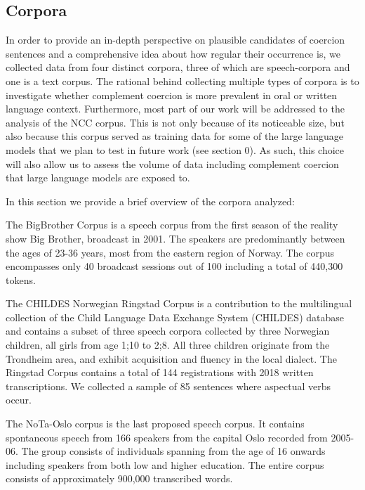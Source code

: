 \documentclass{article}
\begin{document}
\subsection{Corpora}
In order to provide an in-depth perspective on plausible candidates of coercion sentences and a comprehensive idea about how regular their occurrence is, we collected data from four distinct corpora, three of which are speech-corpora and one is a text corpus. The rational behind collecting multiple types of corpora is to investigate whether complement coercion is more prevalent in oral or written language context. Furthermore, most part of our work will be addressed to the analysis of the NCC corpus. This is not only because of its noticeable size, but also because this corpus served as training data for some of the large language models that we plan to test in future work (see section 0). As such, this choice will also allow us to assess the volume of data including complement coercion that large language models are exposed to. 

In this section we provide a brief overview of the corpora analyzed:

The BigBrother Corpus is a speech corpus from the first season of the reality show Big Brother, broadcast in 2001. The speakers are predominantly between the ages of 23-36 years, most from the eastern region of Norway. The corpus encompasses only 40 broadcast sessions out of 100 including a total of 440,300 tokens.

The CHILDES Norwegian Ringstad Corpus \parencite{larsen_byggeklossar_2014} is a contribution to the multilingual collection of the Child Language Data Exchange System (CHILDES) database \parencite{macwhinney_childes_2000} and contains a subset of three speech corpora collected by three Norwegian children, all girls from age 1;10 to 2;8. All three children originate from the Trondheim area, and exhibit acquisition and fluency in the local dialect. The Ringstad Corpus contains a total of 144 registrations with 2018 written transcriptions. We collected a sample of 85 sentences where aspectual verbs occur.

The NoTa-Oslo corpus \parencite{hagen_two_2014} is the last proposed speech corpus. It contains spontaneous speech from 166 speakers from the capital Oslo recorded from 2005-06. The group consists of individuals spanning from the age of 16 onwards including speakers from both low and higher education. The entire corpus consists of approximately 900,000 transcribed words.
\end{document}
